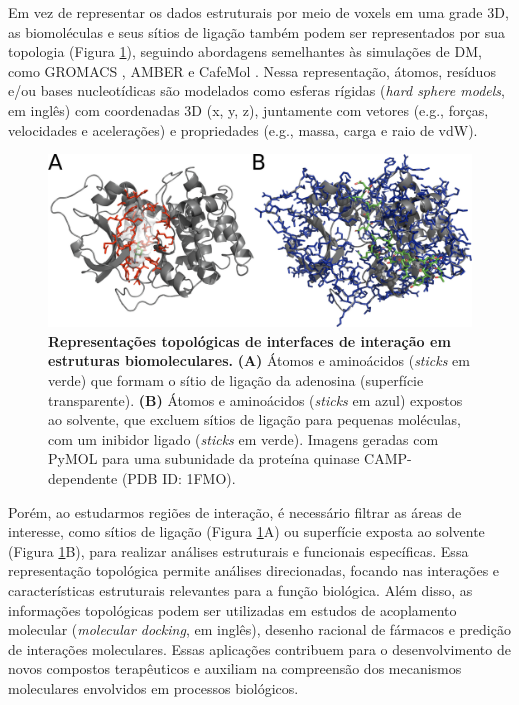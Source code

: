 \documentclass[Portugues]{phdquali}
\def\eg{e.g.\onedot}
\begin{document}
Em vez de representar os dados estruturais por meio de voxels em uma grade 3D, as biomoléculas e seus sítios de ligação também podem ser representados por sua topologia (Figura \ref{fig:topology-representation}), seguindo abordagens semelhantes às simulações de DM, como GROMACS \cite{gromacs}, AMBER \cite{amber} e CafeMol \cite{kenzaki2011}. Nessa representação, átomos, resíduos e/ou bases nucleotídicas são modelados como esferas rígidas (\textit{hard sphere models}, em inglês) com coordenadas 3D (x, y, z), juntamente com vetores (\eg, forças, velocidades e acelerações) e propriedades (\eg, massa, carga e raio de vdW).

\begin{figure}[ht]
  \centerline{\includegraphics[scale=2]{images/topology-representation.png}}
  \caption[Representações topológicas de interfaces de interação em estruturas biomoleculares]{\textbf{Representações topológicas de interfaces de interação em estruturas biomoleculares.} \textbf{(A)} Átomos e aminoácidos (\textit{sticks} em verde) que formam o sítio de ligação da adenosina (superfície transparente). \textbf{(B)} Átomos e aminoácidos (\textit{sticks} em azul) expostos ao solvente, que excluem sítios de ligação para pequenas moléculas, com um inibidor ligado (\textit{sticks} em verde). Imagens geradas com PyMOL para uma subunidade da proteína quinase CAMP-dependente (PDB ID: 1FMO).}
  \label{fig:topology-representation}
\end{figure}

Porém, ao estudarmos regiões de interação, é necessário filtrar as áreas de interesse, como sítios de ligação (Figura \ref{fig:topology-representation}A) ou superfície exposta ao solvente (Figura \ref{fig:topology-representation}B), para realizar análises estruturais e funcionais específicas. Essa representação topológica permite análises direcionadas, focando nas interações e características estruturais relevantes para a função biológica. Além disso, as informações topológicas podem ser utilizadas em estudos de acoplamento molecular (\textit{molecular docking}, em inglês), desenho racional de fármacos e predição de interações moleculares. Essas aplicações contribuem para o desenvolvimento de novos compostos terapêuticos e auxiliam na compreensão dos mecanismos moleculares envolvidos em processos biológicos.
\end{document}
